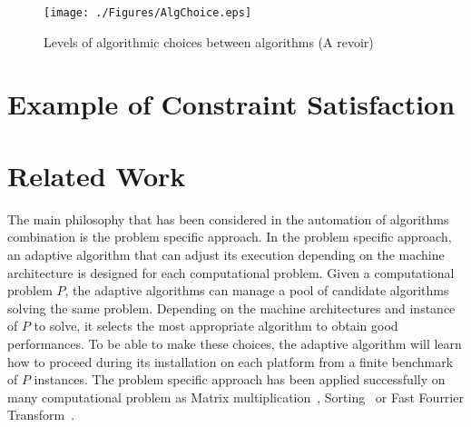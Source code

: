 \begin{figure}[!htbp]
\begin{center}
\texttt{[image: ./Figures/AlgChoice.eps]}
\caption{Levels of algorithmic  choices between algorithms (A revoir)}
 \label{choice}
\end{center}
\end{figure}


\section{Example of Constraint Satisfaction} \label{example}



\section{Related Work} \label{Related}

The main philosophy that has been considered in the automation of algorithms 
combination is the problem specific approach. In the problem specific approach, 
an adaptive algorithm that can adjust its execution depending 
on the machine architecture is designed for each computational problem. 
Given a computational problem $P$, the adaptive algorithms can manage a pool of candidate 
algorithms solving the same problem. Depending on the machine architectures and instance of $P$ 
to solve, it selects the most appropriate algorithm to obtain good performances. 
To be able to make these choices, the adaptive algorithm will learn how to proceed during its installation on each 
platform from a finite benchmark of $P$ instances. The problem specific 
approach has been applied successfully on many computational problem as Matrix multiplication~\cite{ATLAS,Salsa}, 
Sorting~\cite{STAPL,Spiral,ATSL} or Fast Fourrier Transform~\cite{Spiral,FFTW}.  

